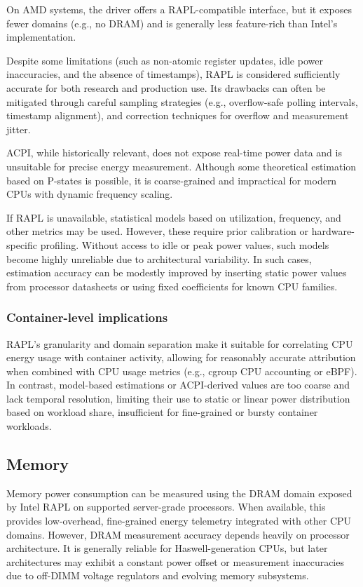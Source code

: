 On AMD systems, the  driver offers a RAPL-compatible interface, but it exposes fewer domains (e.g., no DRAM) and is generally less feature-rich than Intel's implementation.

Despite some limitations (such as non-atomic register updates, idle power inaccuracies, and the absence of timestamps), RAPL is considered sufficiently accurate for both research and production use. Its drawbacks can often be mitigated through careful sampling strategies (e.g., overflow-safe polling intervals, timestamp alignment), and correction techniques for overflow and measurement jitter.

ACPI, while historically relevant, does not expose real-time power data and is unsuitable for precise energy measurement. Although some theoretical estimation based on P-states is possible, it is coarse-grained and impractical for modern CPUs with dynamic frequency scaling.

If RAPL is unavailable, statistical models based on utilization, frequency, and other metrics may be used. However, these require prior calibration or hardware-specific profiling. Without access to idle or peak power values, such models become highly unreliable due to architectural variability. In such cases, estimation accuracy can be modestly improved by inserting static power values from processor datasheets or using fixed coefficients for known CPU families.

\subsubsection{Container-level implications}
RAPL’s granularity and domain separation make it suitable for correlating CPU energy usage with container activity, allowing for reasonably accurate attribution when combined with CPU usage metrics (e.g., cgroup CPU accounting or eBPF). In contrast, model-based estimations or ACPI-derived values are too coarse and lack temporal resolution, limiting their use to static or linear power distribution based on workload share, insufficient for fine-grained or bursty container workloads.

\subsection{Memory}

Memory power consumption can be measured using the DRAM domain exposed by Intel RAPL on supported server-grade processors. When available, this provides low-overhead, fine-grained energy telemetry integrated with other CPU domains. However, DRAM measurement accuracy depends heavily on processor architecture. It is generally reliable for Haswell-generation CPUs, but later architectures may exhibit a constant power offset or measurement inaccuracies due to off-DIMM voltage regulators and evolving memory subsystems.

